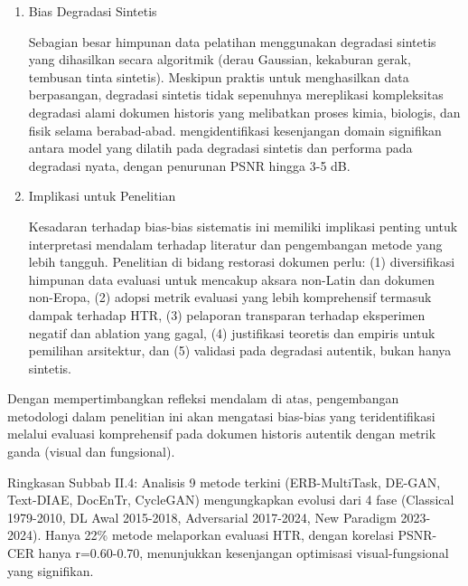 \begin{enumerate}[leftmargin=*, labelindent=0pt, itemsep=1ex, topsep=0pt]
Dominasi CNN dalam literatur 2015-2020 dan transisi ke Transformer 2020-sekarang mencerminkan tren riset global dalam pembelajaran mendalam, bukan bukti konklusif superioritas inheren untuk semua kasus penggunaan restorasi dokumen. Penelitian cenderung mengadopsi arsitektur yang sedang populer (\textit{ViT}, \textit{Swin Transformer}) tanpa justifikasi teoretis atau empiris yang kuat untuk dokumen historis spesifik domain. Bias ini dapat mengalihkan perhatian dari pendekatan yang lebih sederhana namun efektif, atau kombinasi yang lebih seimbang antara arsitektur klasik dan modern.

\item Bias Degradasi Sintetis
\label{para:bias-degradasi}

Sebagian besar himpunan data pelatihan menggunakan degradasi sintetis yang dihasilkan secara algoritmik (derau Gaussian, kekaburan gerak, tembusan tinta sintetis). Meskipun praktis untuk menghasilkan data berpasangan, degradasi sintetis tidak sepenuhnya mereplikasi kompleksitas degradasi alami dokumen historis yang melibatkan proses kimia, biologis, dan fisik selama berabad-abad. \parencite{souibgui2022docentr} mengidentifikasi kesenjangan domain signifikan antara model yang dilatih pada degradasi sintetis dan performa pada degradasi nyata, dengan penurunan PSNR hingga 3-5 dB.

\item Implikasi untuk Penelitian
\label{para:bias-implikasi}

Kesadaran terhadap bias-bias sistematis ini memiliki implikasi penting untuk interpretasi mendalam terhadap literatur dan pengembangan metode yang lebih tangguh. Penelitian di bidang restorasi dokumen perlu: (1) diversifikasi himpunan data evaluasi untuk mencakup aksara non-Latin dan dokumen non-Eropa, (2) adopsi metrik evaluasi yang lebih komprehensif termasuk dampak terhadap HTR, (3) pelaporan transparan terhadap eksperimen negatif dan ablation yang gagal, (4) justifikasi teoretis dan empiris untuk pemilihan arsitektur, dan (5) validasi pada degradasi autentik, bukan hanya sintetis.

\end{enumerate}

Dengan mempertimbangkan refleksi mendalam di atas, pengembangan metodologi dalam penelitian ini akan mengatasi bias-bias yang teridentifikasi melalui evaluasi komprehensif pada dokumen historis autentik dengan metrik ganda (visual dan fungsional).

Ringkasan Subbab II.4: Analisis 9 metode terkini (ERB-MultiTask, DE-GAN, Text-DIAE, DocEnTr, CycleGAN) mengungkapkan evolusi dari 4 fase (Classical 1979-2010, DL Awal 2015-2018, Adversarial 2017-2024, New Paradigm 2023-2024). Hanya 22\% metode melaporkan evaluasi HTR, dengan korelasi PSNR-CER hanya r=0.60-0.70, menunjukkan kesenjangan optimisasi visual-fungsional yang signifikan.



